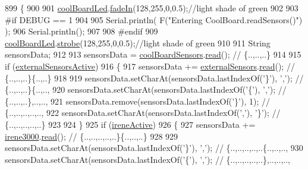 \begin{DoxyCode}
899 \{
900 
901     \hyperlink{classCoolBoard_a1b1d3c684a5baa56b08486e192fd8e97}{coolBoardLed}.\hyperlink{classCoolBoardLed_ab778f5e7bed0ab74e3906d82110493c3}{fadeIn}(128,255,0,0.5);\textcolor{comment}{//light shade of green}
902                 
903 \textcolor{preprocessor}{#if DEBUG == 1}
904 
905     Serial.println( F(\textcolor{stringliteral}{"Entering CoolBoard.readSensors()"}) );
906     Serial.println();
907 
908 \textcolor{preprocessor}{#endif}
909     \hyperlink{classCoolBoard_a1b1d3c684a5baa56b08486e192fd8e97}{coolBoardLed}.\hyperlink{classCoolBoardLed_ad5f0de4c628cbfbf49896042831c64ad}{strobe}(128,255,0,0.5);\textcolor{comment}{//light shade of green}
910 
911     String sensorsData;
912 
913     sensorsData = \hyperlink{classCoolBoard_af102be5288bd7f7a8e59b13f86e26a00}{coolBoardSensors}.\hyperlink{classCoolBoardSensors_a91badb2539d91fda8679f2a597874c48}{read}(); \textcolor{comment}{// \{..,..,..\}}
914     
915     \textcolor{keywordflow}{if} (\hyperlink{classCoolBoard_a638b00b76aeb819ecfd4c10b8cdd7bb7}{externalSensorsActive})
916     \{
917         sensorsData += \hyperlink{classCoolBoard_a09e26264839c65873eb56af476eff6b2}{externalSensors}.\hyperlink{classExternalSensors_a53177b81eca3be89508b5511ddcd00fc}{read}(); \textcolor{comment}{// \{..,..,..\}\{..,..\}}
918 
919         sensorsData.setCharAt(sensorsData.lastIndexOf(\textcolor{charliteral}{'\}'}), \textcolor{charliteral}{','}); \textcolor{comment}{// \{..,..,..\}\{..,..,}
920         sensorsData.setCharAt(sensorsData.lastIndexOf(\textcolor{charliteral}{'\{'}), \textcolor{charliteral}{','}); \textcolor{comment}{// \{..,..,..\},..,..,}
921         sensorsData.remove(sensorsData.lastIndexOf(\textcolor{charliteral}{'\}'}), 1); \textcolor{comment}{// \{..,..,..,..,..,}
922         sensorsData.setCharAt(sensorsData.lastIndexOf(\textcolor{charliteral}{','}), \textcolor{charliteral}{'\}'}); \textcolor{comment}{// \{..,..,..,..,..\}}
923 
924     \}
925     \textcolor{keywordflow}{if} (\hyperlink{classCoolBoard_a9c3f7ac625481ee2ae802a25d97a4ae0}{ireneActive})
926     \{
927         sensorsData += \hyperlink{classCoolBoard_ad103718ce316006c4695b8eb312eaf11}{irene3000}.\hyperlink{classIrene3000_a852a170feea994ea1df01c6b245b5d9a}{read}(); \textcolor{comment}{// \{..,..,..,..,..\}\{..,..,..\}}
928 
929         sensorsData.setCharAt(sensorsData.lastIndexOf(\textcolor{charliteral}{'\}'}), \textcolor{charliteral}{','}); \textcolor{comment}{// \{..,..,..,..,..\{..,..,..,}
930         sensorsData.setCharAt(sensorsData.lastIndexOf(\textcolor{charliteral}{'\{'}), \textcolor{charliteral}{','}); \textcolor{comment}{// \{..,..,..,..,..\},..,..,..,}

\end{DoxyCode}

